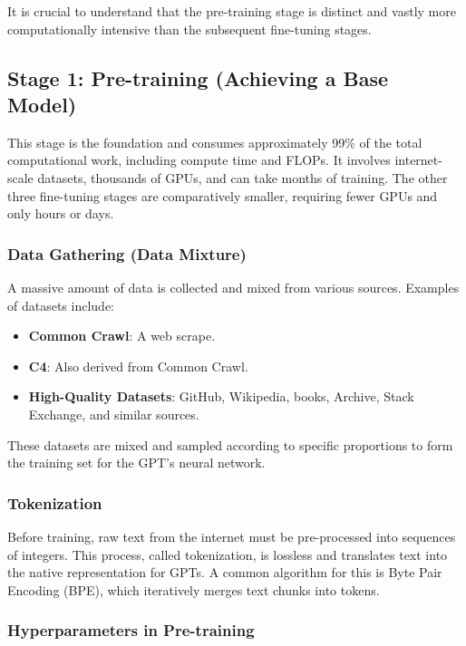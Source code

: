 It is crucial to understand that the pre-training stage is distinct and vastly more computationally intensive than the subsequent fine-tuning stages.

\subsection{Stage 1: Pre-training (Achieving a Base Model)}

This stage is the foundation and consumes approximately 99\% of the total computational work, including compute time and FLOPs. It involves internet-scale datasets, thousands of GPUs, and can take months of training. The other three fine-tuning stages are comparatively smaller, requiring fewer GPUs and only hours or days.

\subsubsection{Data Gathering (Data Mixture)}

A massive amount of data is collected and mixed from various sources. Examples of datasets include:
\begin{itemize}
    \item \textbf{Common Crawl}: A web scrape.
    \item \textbf{C4}: Also derived from Common Crawl.
    \item \textbf{High-Quality Datasets}: GitHub, Wikipedia, books, Archive, Stack Exchange, and similar sources.
\end{itemize}
These datasets are mixed and sampled according to specific proportions to form the training set for the GPT's neural network.

\subsubsection{Tokenization}

Before training, raw text from the internet must be pre-processed into sequences of integers. This process, called tokenization, is lossless and translates text into the native representation for GPTs. A common algorithm for this is Byte Pair Encoding (BPE), which iteratively merges text chunks into tokens.

\subsubsection{Hyperparameters in Pre-training}

